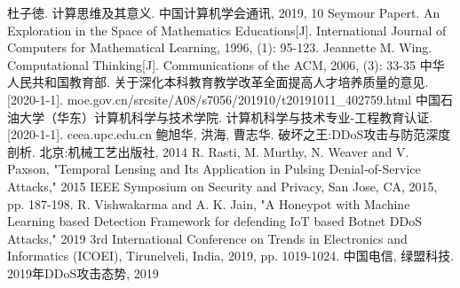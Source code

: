 \documentclass{article}
\begin{document}
\begin{thebibliography}{9}
     杜子徳. 计算思维及其意义. 中国计算机学会通讯, 2019, 10
     Seymour Papert. An Exploration in the Space of Mathematics Educations[J]. International Journal of Computers for Mathematical Learning, 1996, (1): 95-123.
     Jeannette M. Wing. Computational Thinking[J]. Communications of the ACM, 2006, (3): 33-35
     中华人民共和国教育部. 关于深化本科教育教学改革全面提高人才培养质量的意见. [2020-1-1]. moe.gov.cn/srcsite/A08/s7056/201910/t20191011\_402759.html
     中国石油大学（华东）计算机科学与技术学院. 计算机科学与技术专业-工程教育认证. [2020-1-1]. ceea.upc.edu.cn
     鲍旭华, 洪海, 曹志华. 破坏之王:DDoS攻击与防范深度剖析. 北京:机械工艺出版社, 2014
     R. Rasti, M. Murthy, N. Weaver and V. Paxson, "Temporal Lensing and Its Application in Pulsing Denial-of-Service Attacks," 2015 IEEE Symposium on Security and Privacy, San Jose, CA, 2015, pp. 187-198.
     R. Vishwakarma and A. K. Jain, "A Honeypot with Machine Learning based Detection Framework for defending IoT based Botnet DDoS Attacks," 2019 3rd International Conference on Trends in Electronics and Informatics (ICOEI), Tirunelveli, India, 2019, pp. 1019-1024.
     中国电信, 绿盟科技. 2019年DDoS攻击态势, 2019
\end{thebibliography}
\end{document}
